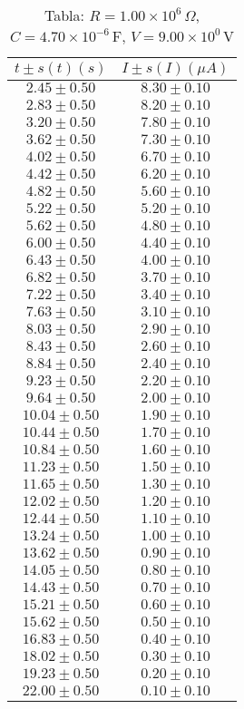 \begin{table}[H]
\centering
\setlength{\arrayrulewidth}{1.2pt}
\begin{tabular}{|c|c|}
\hline
$t \pm s(t) (s)$ & $I \pm s(I) (\mu A)$ \\
\hline
$2.45 \pm 0.50$ & $8.30 \pm 0.10$ \\
$2.83 \pm 0.50$ & $8.20 \pm 0.10$ \\
$3.20 \pm 0.50$ & $7.80 \pm 0.10$ \\
$3.62 \pm 0.50$ & $7.30 \pm 0.10$ \\
$4.02 \pm 0.50$ & $6.70 \pm 0.10$ \\
$4.42 \pm 0.50$ & $6.20 \pm 0.10$ \\
$4.82 \pm 0.50$ & $5.60 \pm 0.10$ \\
$5.22 \pm 0.50$ & $5.20 \pm 0.10$ \\
$5.62 \pm 0.50$ & $4.80 \pm 0.10$ \\
$6.00 \pm 0.50$ & $4.40 \pm 0.10$ \\
$6.43 \pm 0.50$ & $4.00 \pm 0.10$ \\
$6.82 \pm 0.50$ & $3.70 \pm 0.10$ \\
$7.22 \pm 0.50$ & $3.40 \pm 0.10$ \\
$7.63 \pm 0.50$ & $3.10 \pm 0.10$ \\
$8.03 \pm 0.50$ & $2.90 \pm 0.10$ \\
$8.43 \pm 0.50$ & $2.60 \pm 0.10$ \\
$8.84 \pm 0.50$ & $2.40 \pm 0.10$ \\
$9.23 \pm 0.50$ & $2.20 \pm 0.10$ \\
$9.64 \pm 0.50$ & $2.00 \pm 0.10$ \\
$10.04 \pm 0.50$ & $1.90 \pm 0.10$ \\
$10.44 \pm 0.50$ & $1.70 \pm 0.10$ \\
$10.84 \pm 0.50$ & $1.60 \pm 0.10$ \\
$11.23 \pm 0.50$ & $1.50 \pm 0.10$ \\
$11.65 \pm 0.50$ & $1.30 \pm 0.10$ \\
$12.02 \pm 0.50$ & $1.20 \pm 0.10$ \\
$12.44 \pm 0.50$ & $1.10 \pm 0.10$ \\
$13.24 \pm 0.50$ & $1.00 \pm 0.10$ \\
$13.62 \pm 0.50$ & $0.90 \pm 0.10$ \\
$14.05 \pm 0.50$ & $0.80 \pm 0.10$ \\
$14.43 \pm 0.50$ & $0.70 \pm 0.10$ \\
$15.21 \pm 0.50$ & $0.60 \pm 0.10$ \\
$15.62 \pm 0.50$ & $0.50 \pm 0.10$ \\
$16.83 \pm 0.50$ & $0.40 \pm 0.10$ \\
$18.02 \pm 0.50$ & $0.30 \pm 0.10$ \\
$19.23 \pm 0.50$ & $0.20 \pm 0.10$ \\
$22.00 \pm 0.50$ & $0.10 \pm 0.10$ \\
\hline
\end{tabular}
\caption*{Tabla: $R = 1.00 \times 10^{6}\,\Omega$, $C = 4.70 \times 10^{-6}$\,F, $V = 9.00 \times 10^{0}$\,V}
\end{table}

